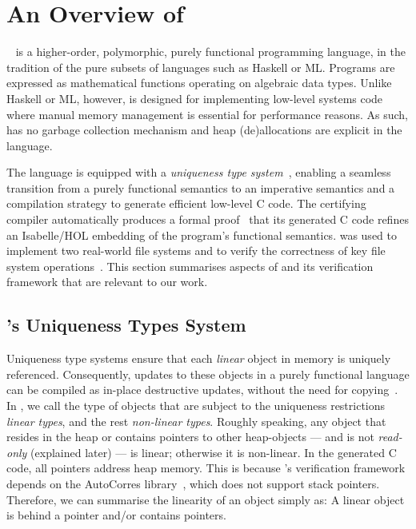 \section{An Overview of \Cogent}{\label{sec:cogent}}

\Cogent~\citep{OConnor:2016, OConnor:thesis, Cogent_JFP_2021} is a higher-order, polymorphic, purely functional programming
language, in the tradition of the pure subsets of languages such as
Haskell or ML. Programs are expressed as mathematical functions
operating on algebraic data types. Unlike Haskell or ML, however,
\Cogent is designed for implementing low-level systems code where manual
memory management is essential for performance reasons. As such,
\Cogent has no garbage collection mechanism and heap (de)allocations are
explicit in the language.

The \cogent language is equipped with a \emph{uniqueness type
system}~\citep{wadler:90, clean:93}, enabling a seamless transition from a
purely functional semantics to an imperative semantics and a compilation
strategy to generate efficient low-level C code.
%
The certifying compiler automatically produces a formal
proof~\citep{Rizkallah:itp16} that its generated C code refines an Isabelle/HOL
embedding of the \cogent program's functional semantics. \Cogent was used to
implement two real-world file systems and to verify the correctness of key file
system operations~\citep{Amani:2016}.
This section summarises aspects of \cogent and its verification framework that
are relevant to our work.

\subsection{\Cogent's Uniqueness Types System}

Uniqueness type systems ensure that each \emph{linear} object in memory
is uniquely referenced. Consequently, updates to these objects in a
purely functional language can be compiled as in-place destructive
updates, without the need for copying~\citep{wadler:90}. In \cogent, we
call the type of objects that are subject to the uniqueness restrictions
\emph{linear types}, and the rest \emph{non-linear types}.  Roughly
speaking, any object that resides in the heap or contains pointers to
other heap-objects --- and is not \emph{read-only} (explained later) ---
is linear; otherwise it is non-linear.  In the generated C code, all
pointers address heap memory.  This is because \cogent's verification
framework depends on the AutoCorres library~\citep{autocorres}, which
does not support stack pointers.  Therefore, we can summarise the
linearity of an object simply as: A linear object is behind a pointer
and/or contains pointers.

